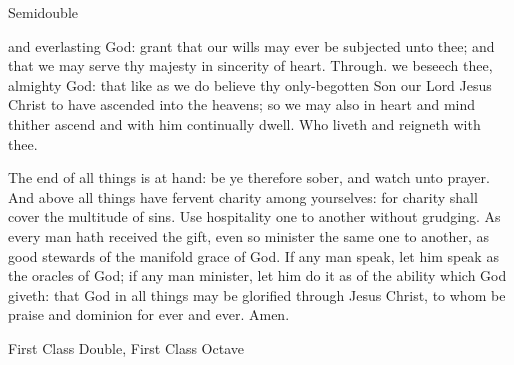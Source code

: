 \begin{inhead}
    {Semidouble}
\end{inhead}

\collect
{} and everlasting God: grant that our wills may ever be subjected unto thee; and that we may serve thy majesty in sincerity of heart. Through.
 we beseech thee, almighty God: that like as we do believe thy only-begotten Son our Lord Jesus Christ to have ascended into the heavens; so we may also in heart and mind thither ascend and with him continually dwell. Who liveth and reigneth with thee.


 The end of all things is at hand:
%
be ye therefore sober, and watch unto prayer. And above all things have fervent charity among yourselves: for charity shall cover the multitude of sins. Use hospitality one to another without grudging. As every man hath received the gift, even so minister the same one to another, as good stewards of the manifold grace of God. If any man speak, let him speak as the oracles of God; if any man minister, let him do it as of the ability which God giveth: that God in all things may be glorified through Jesus Christ,
%
to whom be praise and dominion for ever and ever. Amen.

\begin{inhead}
    {First Class Double, First Class Octave}
\end{inhead}

